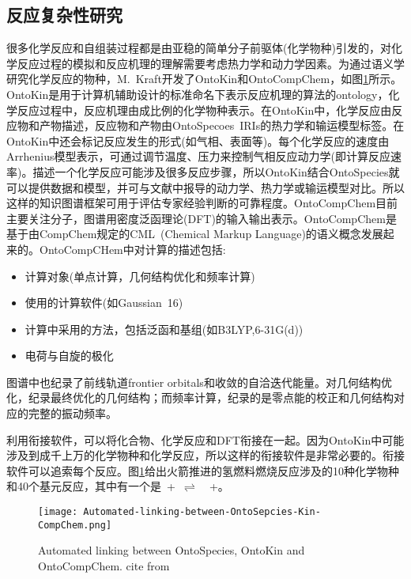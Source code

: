 \subsection{反应复杂性研究}
很多化学反应和自组装过程都是由亚稳的简单分子前驱体(化学物种)引发的，对化学反应过程的模拟和反应机理的理解需要考虑热力学和动力学因素。为通过语义学研究化学反应的物种，\textrm{M.~Kraft}开发了\textrm{OntoKin}和\textrm{OntoCompChem}，如图\ref{Fig:Automated-linking-between-OntoSpecies-Kin-CompChem}所示。\textrm{OntoKin}是用于计算机辅助设计的标准命名下表示反应机理的算法的\textrm{ontology}，化学反应过程中，反应机理由成比例的化学物种表示。在\textrm{OntoKin}中，化学反应由反应物和产物描述，反应物和产物由\textrm{OntoSpecoes~IRIs}的热力学和输运模型标签。在\textrm{OntoKin}中还会标记反应发生的形式(如气相、表面等)。每个化学反应的速度由\textrm{Arrhenius}模型表示，可通过调节温度、压力来控制气相反应动力学(即计算反应速率)。描述一个化学反应可能涉及很多反应步骤，所以\textrm{OntoKin}结合\textrm{OntoSpecies}就可以提供数据和模型，并可与文献中报导的动力学、热力学或输运模型对比。所以这样的知识图谱框架可用于评估专家经验判断的可靠程度。\textrm{OntoCompChem}目前主要关注分子，图谱用密度泛函理论\textrm{(DFT)}的输入输出表示。\textrm{OntoCompChem}是基于由\textrm{CompChem}规定的\textrm{CML~(Chemical Markup Language)}的语义概念发展起来的。\textrm{OntoCompCHem}中对计算的描述包括:
\begin{itemize}
	\item 计算对象(单点计算，几何结构优化和频率计算)
	\item 使用的计算软件(如\textrm{Gaussian~16})
	\item 计算中采用的方法，包括泛函和基组(如\textrm{B3LYP,6-31G(d)})
	\item 电荷与自旋的极化
\end{itemize}
图谱中也纪录了前线轨道\textrm{frontier orbitals}和收敛的自洽迭代能量。对几何结构优化，纪录最终优化的几何结构；而频率计算，纪录的是零点能的校正和几何结构对应的完整的振动频率。

利用衔接软件，可以将化合物、化学反应和\textrm{DFT}衔接在一起。因为\textrm{OntoKin}中可能涉及到成千上万的化学物种和化学反应，所以这样的衔接软件是非常必要的。衔接软件可以追索每个反应。图\ref{Fig:Automated-linking-between-OntoSpecies-Kin-CompChem}给出火箭推进的氢燃料燃烧反应涉及的10种化学物种和40个基元反应，其中有一个是~+~$\rightleftharpoons$~~+。
\begin{figure}[h!]
\centering
\texttt{[image: Automated-linking-between-OntoSepcies-Kin-CompChem.png]}
\caption{\small\textrm{Automated linking between OntoSpecies, OntoKin and OntoCompChem. cite from\cite{ACR56-128_2023}}}%
\label{Fig:Automated-linking-between-OntoSpecies-Kin-CompChem}
\end{figure}
